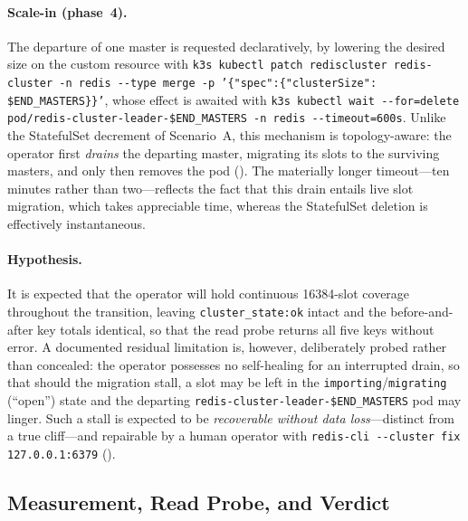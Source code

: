 \paragraph{Scale-in (phase~4).} The departure of one master is requested declaratively, by
lowering the desired size on the custom resource with
\texttt{k3s kubectl patch rediscluster redis-cluster -n redis -{}-type merge -p '\{"spec":\{"clusterSize": \$END\_MASTERS\}\}'},
whose effect is awaited with
\texttt{k3s kubectl wait -{}-for=delete pod/redis-cluster-leader-\$END\_MASTERS -n redis -{}-timeout=600s}.
Unlike the StatefulSet decrement of Scenario~A, this mechanism is topology-aware: the
operator first \emph{drains} the departing master, migrating its slots to the surviving
masters, and only then removes the pod (\cite{redis:scaling}). The materially longer
timeout---ten minutes rather than two---reflects the fact that this drain entails live slot
migration, which takes appreciable time, whereas the StatefulSet deletion is effectively
instantaneous.

\paragraph{Hypothesis.} It is expected that the operator will hold continuous \num{16384}-slot
coverage throughout the transition, leaving \texttt{cluster\_state:ok} intact and the
before-and-after key totals identical, so that the read probe returns all five keys without
error. A documented residual limitation is, however, deliberately probed rather than
concealed: the operator possesses no self-healing for an interrupted drain, so that should the
migration stall, a slot may be left in the \texttt{importing}/\texttt{migrating}
(\enquote{open}) state and the departing \texttt{redis-cluster-leader-\$END\_MASTERS} pod may
linger. Such a stall is expected to be \emph{recoverable without data loss}---distinct from a
true cliff---and repairable by a human operator with
\texttt{redis-cli -{}-cluster fix 127.0.0.1:6379} (\cite{redis:clusterspec}).

\subsection{Measurement, Read Probe, and Verdict}\label{subsec:flow-verdict}

